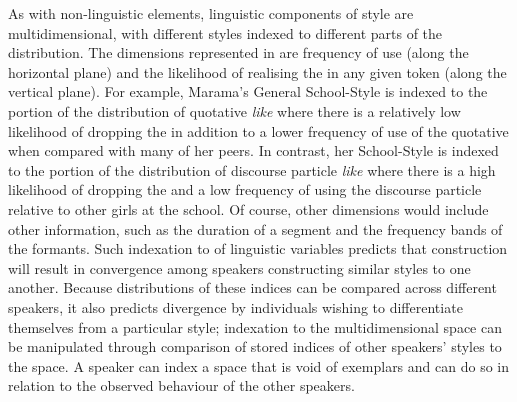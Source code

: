 As with non-linguistic elements, linguistic components of style are multidimensional, with different styles indexed to different parts of the distribution.  The dimensions represented in  are frequency of use (along the horizontal plane) and the likelihood of realising the  in any given token (along the vertical plane). For example, Marama's General School-Style is indexed to the portion of the distribution of quotative \textit{like} where there is a relatively low likelihood of dropping the  in addition to a lower frequency of use of the quotative when compared with many of her peers.  In contrast, her School-Style is indexed to the portion of the distribution of discourse particle \textit{like} where there is a high likelihood of dropping the  and a low frequency of using the discourse particle relative to other girls at the school.  Of course, other dimensions would include other information, such as the duration of a segment and the frequency bands of the formants.  Such indexation to  of linguistic variables predicts that  construction will result in convergence among speakers constructing similar styles to one another.  Because distributions of these indices can be compared across different speakers, it also predicts divergence by individuals wishing to differentiate themselves from a particular style; indexation to the multidimensional space can be manipulated through comparison of stored indices of other speakers' styles to the space.  A speaker can index a space that is void of exemplars and can do so in relation to the observed behaviour of the other speakers.

